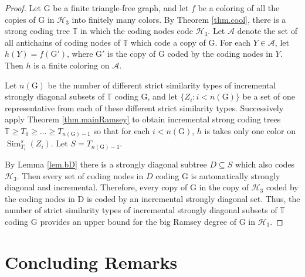 \documentclass{amsart}
\theoremstyle{remark}
\theoremstyle{definition}
\theoremstyle{remark}
\newcommand{\sse}{\subseteq}
\DeclareMathOperator{\Sim}{Sim}
\newcommand{\bT}{\mathbb{T}}
\newcommand{\G}{\mathrm{G}}
\newcommand{\D}{\mathrm{D}}
\begin{document}
\begin{proof}
Let $\G$ be a finite triangle-free graph,
and let $f$ be a coloring of all the copies of $\G$ in $\mathcal{H}_3$ into finitely many colors.
By Theorem \ref{thm.cool}, there is a
 strong coding tree $\bT$ in which the coding nodes code $\mathcal{H}_3$.
Let $\mathcal{A}$ denote the set of all
antichains of coding nodes
 of $\bT$ which code a copy of $\G$.
For each $Y\in\mathcal{A}$,
let
$h(Y)=f(\G')$,
where
$\G'$ is the copy of $\G$
coded by the coding nodes in $Y$.
Then $h$  is a finite coloring on $\mathcal{A}$.



Let $n(\G)$ be the number of different strict similarity types
of incremental strongly diagonal subsets of $\bT$ coding $\G$,
and let $\{Z_i:i<n(\G)\}$ be a set of one representative from  each of  these  different strict similarity types.
Successively
apply Theorem \ref{thm.mainRamsey}
  to obtain incremental strong coding trees $\bT\ge T_0\ge\dots\ge T_{n(\G)-1}$ so that for each $i<n(\G)$,
$h$ is takes only one color on
$\Sim^s_{T_i}(Z_i)$.
Let $S=T_{n(\G)-1}$.



By Lemma \ref{lem.bD}
there is a strongly diagonal subtree $D\sse S$ which also codes $\mathcal{H}_3$.
Then every set of coding nodes in $D$ coding $\G$ is automatically strongly diagonal and incremental.
Therefore, every copy  of $\G$ in the copy of $\mathcal{H}_3$ coded by the coding nodes in $\D$
is coded by an incremental strongly diagonal set.
Thus, the number of
 strict similarity types of  incremental strongly  diagonal  subsets of $\bT$  coding $\G$
provides an upper bound for
the big Ramsey degree of $\G$ in $\mathcal{H}_3$.
\end{proof}










\section{Concluding Remarks}
\end{document}

